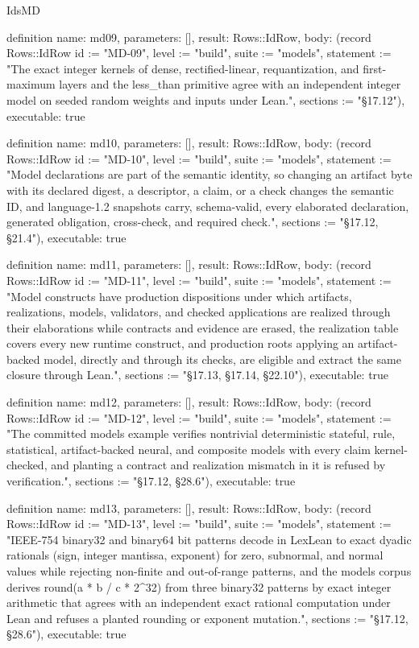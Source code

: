 \begin{lexlean}{IdsMD}
\begin{semanticmodule}
definition{
  name: md09,
  parameters: [],
  result: Rows::IdRow,
  body: (record Rows::IdRow {id := "MD-09", level := "build", suite := "models", statement := "The exact integer kernels of dense, rectified-linear, requantization, and first-maximum layers and the less_than primitive agree with an independent integer model on seeded random weights and inputs under Lean.", sections := "§17.12"}),
  executable: true
}

definition{
  name: md10,
  parameters: [],
  result: Rows::IdRow,
  body: (record Rows::IdRow {id := "MD-10", level := "build", suite := "models", statement := "Model declarations are part of the semantic identity, so changing an artifact byte with its declared digest, a descriptor, a claim, or a check changes the semantic ID, and language-1.2 snapshots carry, schema-valid, every elaborated declaration, generated obligation, cross-check, and required check.", sections := "§17.12, §21.4"}),
  executable: true
}

definition{
  name: md11,
  parameters: [],
  result: Rows::IdRow,
  body: (record Rows::IdRow {id := "MD-11", level := "build", suite := "models", statement := "Model constructs have production dispositions under which artifacts, realizations, models, validators, and checked applications are realized through their elaborations while contracts and evidence are erased, the realization table covers every new runtime construct, and production roots applying an artifact-backed model, directly and through its checks, are eligible and extract the same closure through Lean.", sections := "§17.13, §17.14, §22.10"}),
  executable: true
}

definition{
  name: md12,
  parameters: [],
  result: Rows::IdRow,
  body: (record Rows::IdRow {id := "MD-12", level := "build", suite := "models", statement := "The committed models example verifies nontrivial deterministic stateful, rule, statistical, artifact-backed neural, and composite models with every claim kernel-checked, and planting a contract and realization mismatch in it is refused by verification.", sections := "§17.12, §28.6"}),
  executable: true
}

definition{
  name: md13,
  parameters: [],
  result: Rows::IdRow,
  body: (record Rows::IdRow {id := "MD-13", level := "build", suite := "models", statement := "IEEE-754 binary32 and binary64 bit patterns decode in LexLean to exact dyadic rationals (sign, integer mantissa, exponent) for zero, subnormal, and normal values while rejecting non-finite and out-of-range patterns, and the models corpus derives round(a * b / c * 2^32) from three binary32 patterns by exact integer arithmetic that agrees with an independent exact rational computation under Lean and refuses a planted rounding or exponent mutation.", sections := "§17.12, §28.6"}),
  executable: true
}
\end{semanticmodule}
\end{lexlean}
